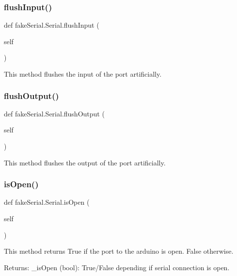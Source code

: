 \subsubsection{\texorpdfstring{flushInput()}{flushInput()}}
{\footnotesize\ttfamily def fake\+Serial.\+Serial.\+flush\+Input (\begin{DoxyParamCaption}\item[{}]{self }\end{DoxyParamCaption})}

\begin{DoxyVerb}This method flushes the input of the port artificially.
\end{DoxyVerb}
 \mbox{\label{classfake_serial_1_1_serial_afecff2730c11a9a8e7f687c57a2c738a}} 
\subsubsection{\texorpdfstring{flushOutput()}{flushOutput()}}
{\footnotesize\ttfamily def fake\+Serial.\+Serial.\+flush\+Output (\begin{DoxyParamCaption}\item[{}]{self }\end{DoxyParamCaption})}

\begin{DoxyVerb}This method flushes the output of the port artificially.
\end{DoxyVerb}
 \mbox{\label{classfake_serial_1_1_serial_a69cc2297e7c5bfb87de4df789774f3a2}} 
\subsubsection{\texorpdfstring{isOpen()}{isOpen()}}
{\footnotesize\ttfamily def fake\+Serial.\+Serial.\+is\+Open (\begin{DoxyParamCaption}\item[{}]{self }\end{DoxyParamCaption})}

\begin{DoxyVerb}This method returns True if the port to the arduino is open. False otherwise.

Returns:
    _isOpen (bool): True/False depending if serial connection is open.
\end{DoxyVerb}
 \mbox{\label{classfake_serial_1_1_serial_a2e4137a108e41f23e49735667d9b4c05}} 
